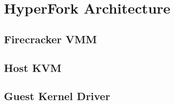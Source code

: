 
\section{HyperFork Architecture} \label{sec:design}

\subsection{Firecracker VMM}

\subsection{Host KVM}

\subsection{Guest Kernel Driver}

